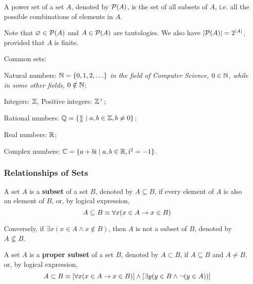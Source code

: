 \begin{definition}
    A power set of a set $A$, denoted by $\mathcal{P}(A)$, is the set of all subsets of $A$,
    i.e. all the possible combinations of elements in $A$.

    Note that $\varnothing \in \mathcal{P}(A)$ and $A \in \mathcal{P}(A)$ are tautologies.
    We also have $|\mathcal{P}(A)| = 2^{|A|}$, provided that $A$ is finite.
\end{definition}

\begin{remark}
    Common sets:
    \begin{enumerate*}[label=(\arabic*)]
        \item Natural numbers: $\mathbb{N} = \{0, 1, 2, \ldots\}$ \textit{in the field of Computer Science,
        $0\in\mathbb{N}$, while in some other fields, $0\notin\mathbb{N}$};
        \item Integers: $\mathbb{Z}$, Positive integers: $\mathbb{Z}^+$;
        \item Rational numbers: $\mathbb{Q} = \{\frac{a}{b} \mid a, b \in \mathbb{Z}, b \neq 0\}$;
        \item Real numbers: $\mathbb{R}$;
        \item Complex numbers: $\mathbb{C} = \{a + b\mathrm{i} \mid a, b \in \mathbb{R}, \mathrm{i}^2 = -1\}$.
    \end{enumerate*}
\end{remark}

\subsubsection{Relationships of Sets}

\begin{definition}[Subset]
    A set $A$ is a \textbf{subset} of a set $B$, denoted by $A \subseteq B$,
    if every element of $A$ is also an element of $B$, or, by logical expression,
    \[
        A\subseteq B \equiv \forall x (x \in A \rightarrow x \in B)
    \]

    Conversely, if $\exists x (x \in A \land x \notin B)$, then $A$ is not a subset of $B$,
    denoted by $A \nsubseteq B$.
\end{definition}

\begin{definition}
    A set $A$ is a \textbf{proper subset} of a set $B$, denoted by $A \subset B$,
    if $A \subseteq B$ and $A \neq B$, or, by logical expression,
    \[
        A \subset B \equiv [\forall x (x \in A \rightarrow x \in B)] \land [\exists y (y \in B \land \neg(y \in A))]
    \]
\end{definition}


